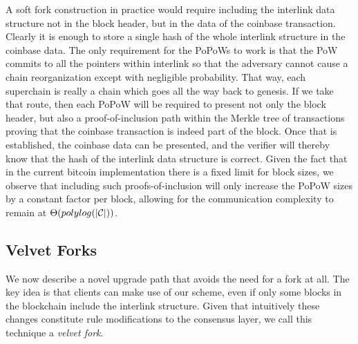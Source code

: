   A soft fork construction in practice would require including the interlink data structure
not in the block header, but in the data of the coinbase transaction.  Clearly
it is enough to store a single hash of the whole interlink structure in the
coinbase data. The only requirement for the PoPoWs to work is that the
PoW commits to all the pointers within interlink so that the adversary cannot
cause a chain reorganization except with negligible probability. That way, each
superchain is really a chain which goes all the way back to genesis. If we take
that route, then each PoPoW will be required to present not only the block
header, but also a proof-of-inclusion path within the Merkle tree of
transactions proving that the coinbase transaction is indeed part of the block.
Once that is established, the coinbase data can be presented, and the verifier
will thereby know that the hash of the interlink data structure is correct.
Given the fact that in the current bitcoin implementation there is a fixed
limit for block sizes, we observe that including such proofs-of-inclusion will
only increase the PoPoW sizes by a constant factor per block, allowing for the
communication complexity to remain at $\Theta(polylog(|\mathcal{C}|))$.


\subsection{Velvet Forks}
We now describe a novel upgrade path that avoids the need for a fork at all.
The key idea is that clients can make use of our scheme, even if only some blocks in the blockchain include the interlink structure.
Given that intuitively these
changes constitute rule modifications to the consensus layer, we call this
technique a \textit{velvet fork}.

